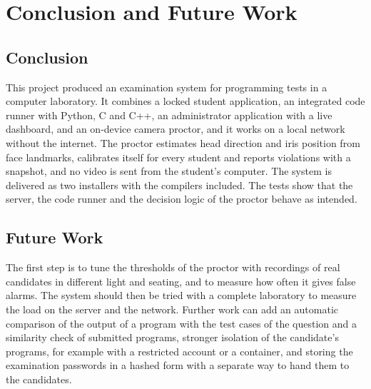 \documentclass[12pt,a4paper]{report}
\begin{document}
\chapter{Conclusion and Future Work}

\section{Conclusion}
This project produced an examination system for programming tests in a computer laboratory. It combines a locked student application, an integrated code runner with Python, C and C++, an administrator application with a live dashboard, and an on-device camera proctor, and it works on a local network without the internet. The proctor estimates head direction and iris position from face landmarks, calibrates itself for every student and reports violations with a snapshot, and no video is sent from the student's computer. The system is delivered as two installers with the compilers included. The tests show that the server, the code runner and the decision logic of the proctor behave as intended.

\section{Future Work}
The first step is to tune the thresholds of the proctor with recordings of real candidates in different light and seating, and to measure how often it gives false alarms. The system should then be tried with a complete laboratory to measure the load on the server and the network. Further work can add an automatic comparison of the output of a program with the test cases of the question and a similarity check of submitted programs, stronger isolation of the candidate's programs, for example with a restricted account or a container, and storing the examination passwords in a hashed form with a separate way to hand them to the candidates.
\end{document}
